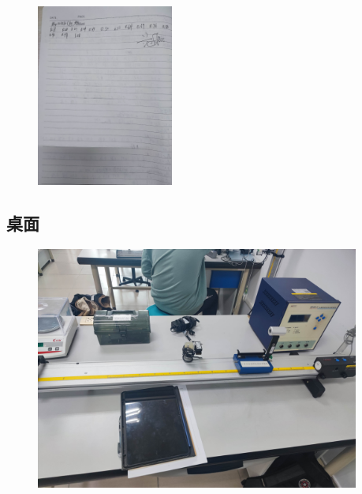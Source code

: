 \documentclass[dvipsnames, svgnames,a4paper,11pt]{article}
\begin{document}
\begin{figure}[H]
	\centering
	\includegraphics[width=0.4\textwidth]{多普勒原件2.jpg}
\end{figure}
\subsection*{桌面}
\begin{figure}[H]
	\includegraphics[width=0.95\textwidth]{多普勒桌面.jpg}
\end{figure}
\end{document}
